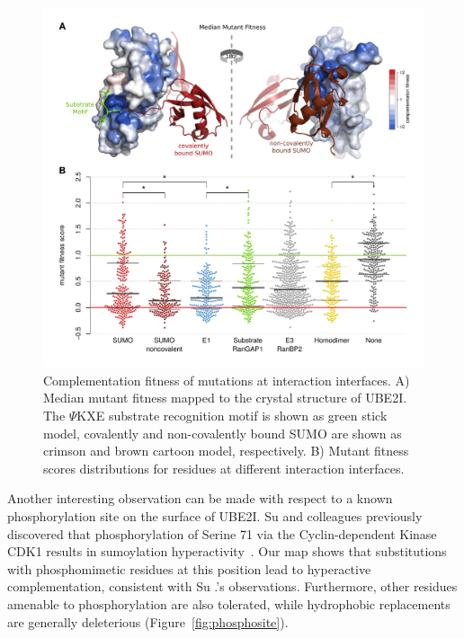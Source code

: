 \begin{figure}[h!]
	\centering
	\includegraphics[width=\textwidth]{img/ube2i_interfaces.pdf}
	\caption{Complementation fitness of mutations at interaction interfaces. A) Median mutant fitness mapped to the crystal structure of UBE2I. The $\Psi$KXE substrate recognition motif is shown as green stick model, covalently and non-covalently bound SUMO are shown as crimson and brown cartoon model, respectively. B) Mutant fitness scores distributions for residues at different interaction interfaces. }
	\label{fig:ube2i_interfaces}
\end{figure}

Another interesting observation can be made with respect to a known phosphorylation site on the surface of UBE2I. Su and colleagues previously discovered that phosphorylation of Serine 71 via the Cyclin-dependent Kinase CDK1 results in sumoylation hyperactivity~\cite{su_phosphorylaton_2012}. Our map shows that substitutions with phosphomimetic residues at this position lead to hyperactive complementation, consistent with Su \etal.'s observations. Furthermore, other residues amenable to phosphorylation are also tolerated, while hydrophobic replacements are generally deleterious (Figure~\ref{fig:phosphosite}).

